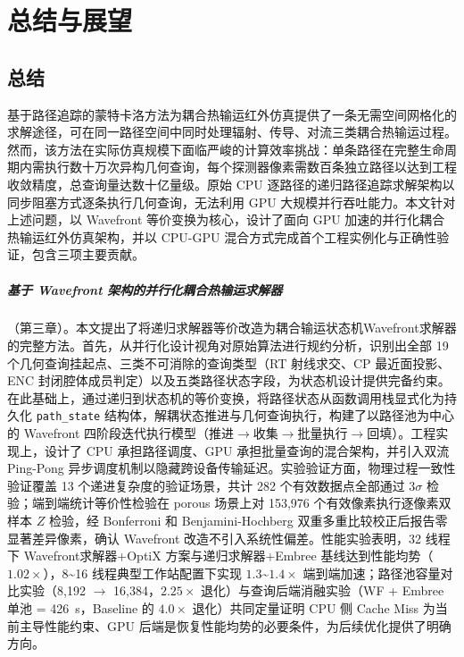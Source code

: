 
\chapter{总结与展望}

\section{总结}

基于路径追踪的蒙特卡洛方法为耦合热输运红外仿真提供了一条无需空间网格化的求解途径，可在同一路径空间中同时处理辐射、传导、对流三类耦合热输运过程。然而，该方法在实际仿真规模下面临严峻的计算效率挑战：单条路径在完整生命周期内需执行数十万次异构几何查询，每个探测器像素需数百条独立路径以达到工程收敛精度，总查询量达数十亿量级。原始 CPU 逐路径的递归路径追踪求解架构以同步阻塞方式逐条执行几何查询，无法利用 GPU 大规模并行吞吐能力。本文针对上述问题，以 Wavefront 等价变换为核心，设计了面向 GPU 加速的并行化耦合热输运红外仿真架构，并以 CPU-GPU 混合方式完成首个工程实例化与正确性验证，包含三项主要贡献。

\paragraph{ 基于 Wavefront 架构的并行化耦合热输运求解器}（第三章）。本文提出了将递归求解器等价改造为耦合输运状态机Wavefront求解器的完整方法。首先，从并行化设计视角对原始算法进行规约分析，识别出全部 19 个几何查询挂起点、三类不可消除的查询类型（RT 射线求交、CP 最近面投影、ENC 封闭腔体成员判定）以及五类路径状态字段，为状态机设计提供完备约束。在此基础上，通过递归到状态机的等价变换，将路径状态从函数调用栈显式化为持久化 \texttt{path\_state} 结构体，解耦状态推进与几何查询执行，构建了以路径池为中心的 Wavefront 四阶段迭代执行模型（推进$\to$收集$\to$批量执行$\to$回填）。工程实现上，设计了 CPU 承担路径调度、GPU 承担批量查询的混合架构，并引入双流 Ping-Pong 异步调度机制以隐藏跨设备传输延迟。实验验证方面，物理过程一致性验证覆盖 13 个递进复杂度的验证场景，共计 282 个有效数据点全部通过 $3\sigma$ 检验；端到端统计等价性检验在 porous 场景上对 153{,}976 个有效像素执行逐像素双样本 $Z$ 检验，经 Bonferroni 和 Benjamini-Hochberg 双重多重比较校正后报告零显著差异像素，确认 Wavefront 改造不引入系统性偏差。性能实验表明，32 线程下 Wavefront求解器+OptiX 方案与递归求解器+Embree 基线达到性能均势（$1.02\times$），8\textasciitilde 16 线程典型工作站配置下实现 $1.3$\textasciitilde$1.4\times$ 端到端加速；路径池容量对比实验（8{,}192 $\to$ 16{,}384，$2.25\times$ 退化）与查询后端消融实验（WF + Embree 单池 = 426~s，Baseline 的 $4.0\times$ 退化）共同定量证明 CPU 侧 Cache Miss 为当前主导性能约束、GPU 后端是恢复性能均势的必要条件，为后续优化提供了明确方向。

